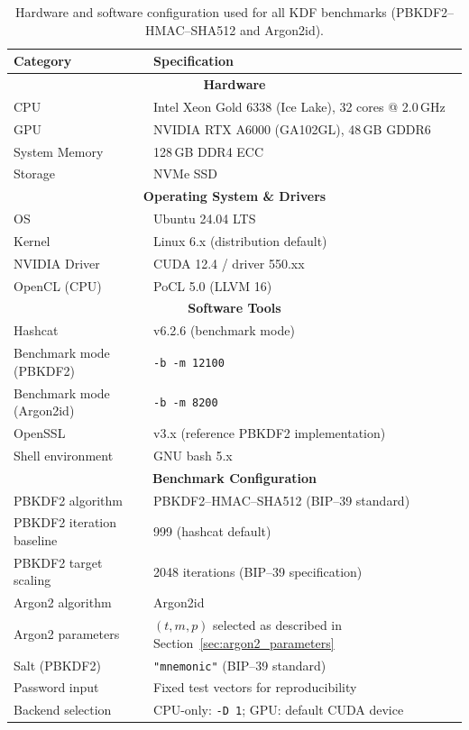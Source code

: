 \documentclass[journal,article,accept,pdftex,moreauthors]{Definitions/mdpi}
\begin{document}
\begin{table}[h]
\centering
\caption{Hardware and software configuration used for all KDF benchmarks (PBKDF2--HMAC--SHA512 and Argon2id).}
\label{tab:exp_setup}
\begin{tabular}{|l|l|}
\hline
\textbf{Category} & \textbf{Specification} \\
\hline
\multicolumn{2}{|c|}{\textbf{Hardware}} \\
\hline
CPU & Intel Xeon Gold 6338 (Ice Lake), 32 cores @ 2.0\,GHz \\
GPU & NVIDIA RTX A6000 (GA102GL), 48\,GB GDDR6 \\
System Memory & 128\,GB DDR4 ECC \\
Storage & NVMe SSD \\
\hline
\multicolumn{2}{|c|}{\textbf{Operating System \& Drivers}} \\
\hline
OS & Ubuntu 24.04 LTS \\
Kernel & Linux 6.x (distribution default) \\
NVIDIA Driver & CUDA 12.4 / driver 550.xx \\
OpenCL (CPU) & PoCL 5.0 (LLVM 16) \\
\hline
\multicolumn{2}{|c|}{\textbf{Software Tools}} \\
\hline
Hashcat & v6.2.6 (benchmark mode) \\
Benchmark mode (PBKDF2) & \texttt{-b -m 12100} \\
Benchmark mode (Argon2id) & \texttt{-b -m 8200} \\
OpenSSL & v3.x (reference PBKDF2 implementation) \\
Shell environment & GNU bash 5.x \\
\hline
\multicolumn{2}{|c|}{\textbf{Benchmark Configuration}} \\
\hline
PBKDF2 algorithm & PBKDF2--HMAC--SHA512 (BIP--39 standard) \\
PBKDF2 iteration baseline & 999 (hashcat default) \\
PBKDF2 target scaling & 2048 iterations (BIP--39 specification) \\
Argon2 algorithm & Argon2id \\
Argon2 parameters & $(t,m,p)$ selected as described in Section~\ref{sec:argon2_parameters} \\
Salt (PBKDF2) & \texttt{"mnemonic"} (BIP--39 standard) \\
Password input & Fixed test vectors for reproducibility \\
Backend selection & CPU-only: \texttt{-D 1}; GPU: default CUDA device \\
\hline
\end{tabular}
\end{table}
\end{document}
